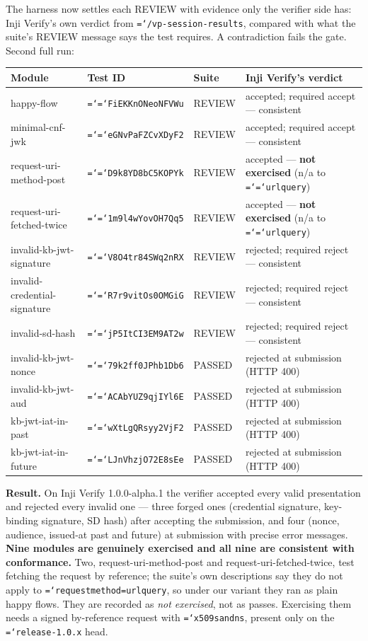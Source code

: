 \documentclass[11pt,a4paper]{article}
\let\origtexttt\texttt
\renewcommand{\texttt}[1]{\origtexttt{\hyphenchar\font=`\-\relax #1}}
\renewcommand{\_}{\textunderscore\allowbreak}
\begin{document}
The harness now settles each REVIEW with evidence only the verifier side has: Inji Verify's
own verdict from \texttt{/vp-session-results}, compared with what the suite's REVIEW message
says the test requires. A contradiction fails the gate. Second full run:

{\footnotesize
\begin{longtable}{>{\raggedright\arraybackslash}p{4.4cm} p{2.95cm} p{1.3cm} >{\raggedright\arraybackslash}p{5.9cm}}
\hline
\textbf{Module} & \textbf{Test ID} & \textbf{Suite} & \textbf{Inji Verify's verdict}\\
\hline
\endhead
happy-flow & \texttt{FiEKKnONeoNFVWu} & REVIEW & accepted; required accept --- consistent\\
minimal-cnf-jwk & \texttt{eGNvPaFZCvXDyF2} & REVIEW & accepted; required accept --- consistent\\
request-uri-method-post & \texttt{D9k8YD8bC5KOPYk} & REVIEW & accepted --- \textbf{not exercised} (n/a to \texttt{url\_query})\\
request-uri-fetched-twice & \texttt{1m9l4wYovOH7Qq5} & REVIEW & accepted --- \textbf{not exercised} (n/a to \texttt{url\_query})\\
invalid-kb-jwt-signature & \texttt{V8O4tr84SWq2nRX} & REVIEW & rejected; required reject --- consistent\\
invalid-credential-signature & \texttt{R7r9vitOs0OMGiG} & REVIEW & rejected; required reject --- consistent\\
invalid-sd-hash & \texttt{jP5ItCI3EM9AT2w} & REVIEW & rejected; required reject --- consistent\\
invalid-kb-jwt-nonce & \texttt{79k2ff0JPhb1Db6} & PASSED & rejected at submission (HTTP 400)\\
invalid-kb-jwt-aud & \texttt{ACAbYUZ9qjIYl6E} & PASSED & rejected at submission (HTTP 400)\\
kb-jwt-iat-in-past & \texttt{wXtLgQRsyy2VjF2} & PASSED & rejected at submission (HTTP 400)\\
kb-jwt-iat-in-future & \texttt{LJnVhzjO72E8sEe} & PASSED & rejected at submission (HTTP 400)\\
\hline
\end{longtable}}

\textbf{Result.} On Inji Verify 1.0.0-alpha.1 the verifier accepted every valid presentation and
rejected every invalid one --- three forged ones (credential signature, key-binding signature,
SD hash) after accepting the submission, and four (nonce, audience, issued-at past and future)
at submission with precise error messages. \textbf{Nine modules are genuinely exercised and all
nine are consistent with conformance.} Two, request-uri-method-post and
request-uri-fetched-twice, test fetching the request by reference; the suite's own
descriptions say they do not apply to \texttt{request\_method=url\_query}, so under our variant
they ran as plain happy flows. They are recorded as \emph{not exercised}, not as passes.
Exercising them needs a signed by-reference request with \texttt{x509\_san\_dns}, present only on
the \texttt{release-1.0.x} head.
\end{document}
